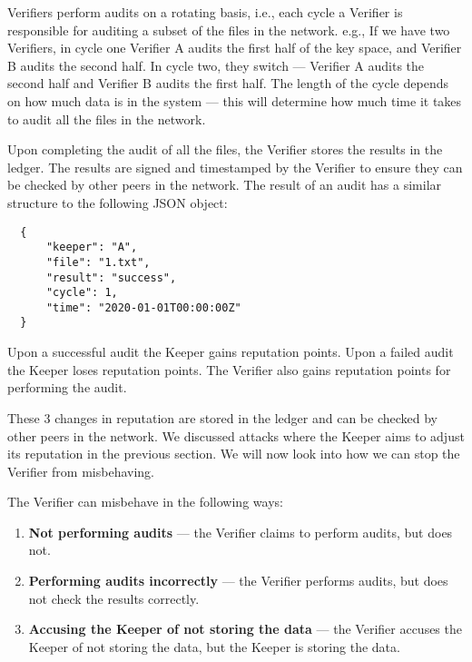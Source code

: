 Verifiers perform audits on a rotating basis, i.e., each cycle a Verifier is responsible for auditing
a subset of the files in the network.
e.g., If we have two Verifiers, in cycle one Verifier A audits the first half of the key space,
and Verifier B audits the second half.
In cycle two, they switch --- Verifier A audits the second half and Verifier B audits the first half.
The length of the cycle depends on how much data is in the system --- this will determine
how much time it takes to audit all the files in the network.

Upon completing the audit of all the files, the Verifier stores the results in the ledger.
The results are signed and timestamped by the Verifier to
ensure they can be checked by other peers in the network.
The result of an audit has a similar structure to the following JSON object:
\begin{verbatim}
  {
      "keeper": "A",
      "file": "1.txt",
      "result": "success",
      "cycle": 1,
      "time": "2020-01-01T00:00:00Z"
  }
\end{verbatim}

Upon a successful audit the Keeper gains reputation points.
Upon a failed audit the Keeper loses reputation points.
The Verifier also gains reputation points for performing the audit.

These 3 changes in reputation are stored in the ledger and can be checked by other peers in the network.
We discussed attacks where the Keeper aims to adjust its reputation in the previous section.
We will now look into how we can stop the Verifier from misbehaving.

The Verifier can misbehave in the following ways:
\begin{enumerate}
    \item \textbf{Not performing audits} --- the Verifier claims to perform audits, but does not.
    \item \textbf{Performing audits incorrectly} --- the Verifier performs audits, but does not check the results correctly.
    \item \textbf{Accusing the Keeper of not storing the data} --- the Verifier accuses the Keeper of not storing the data, but the Keeper is storing the data.
\end{enumerate}

